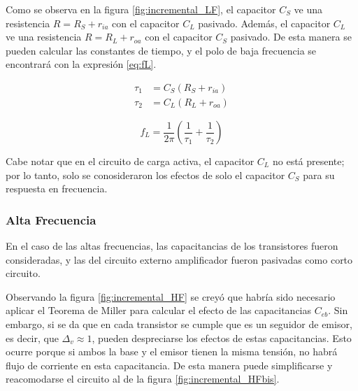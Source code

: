 Como se observa en la figura \ref{fig:incremental_LF}, el capacitor $C_S$ ve una resistencia $R = R_S + r_{ia}$ con el capacitor $C_L$ pasivado. Además, el capacitor $C_L$ ve una resistencia $R = R_L + r_{oa}$ con el capacitor $C_S$ pasivado. De esta manera se pueden calcular las constantes de tiempo, y el polo de baja frecuencia se encontrará con la expresión \eqref{eq:fL}.

\begin{align*}
    \tau_1 &= C_S (R_S + r_{ia}) \\
    \tau_2 &= C_L (R_L + r_{oa})
\end{align*}

\begin{equation}
    f_L = \frac{1}{2\pi}\left(\frac{1}{\tau_1}+\frac{1}{\tau_2}\right)
    \label{eq:fL}
\end{equation}

Cabe notar que en el circuito de carga activa, el capacitor $C_L$ no está presente; por lo tanto, solo se conosideraron los efectos de solo el capacitor $C_S$ para su respuesta en frecuencia.

\subsubsection{Alta Frecuencia}
En el caso de las altas frecuencias, las capacitancias de los transistores fueron consideradas, y las del circuito externo amplificador fueron pasivadas como corto circuito.

Observando la figura \ref{fig:incremental_HF} se creyó que habría sido necesario aplicar el Teorema de Miller para calcular el efecto de las capacitancias $C_{eb}$. Sin embargo, si se da que en cada transistor se cumple que es un seguidor de emisor, es decir, que $\Delta_v \approx 1$, pueden despreciarse los efectos de estas capacitancias. Esto ocurre porque si ambos la base y el emisor tienen la misma tensión, no habrá flujo de corriente en esta capacitancia. De esta manera puede simplificarse y reacomodarse el circuito al de la figura \ref{fig:incremental_HFbis}.

